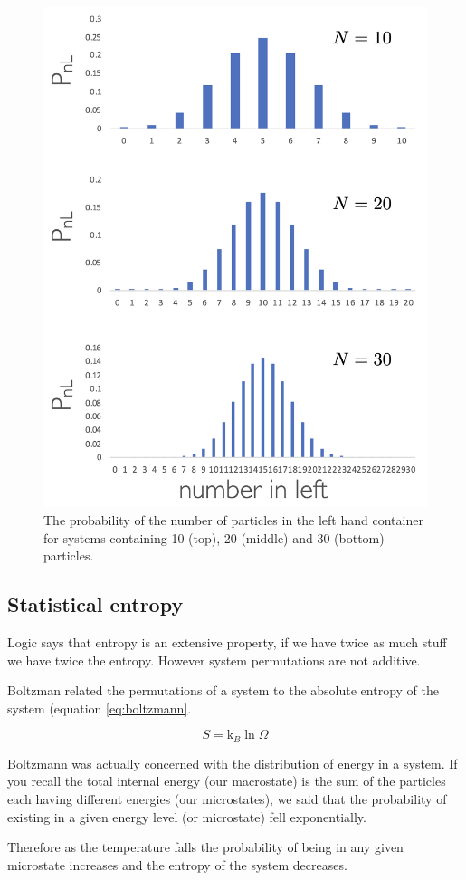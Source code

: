 \documentclass[
]{book}
\begin{document}
\begin{figure}

{\centering \includegraphics[width=0.5\linewidth]{images/probabilityleft} 

}

\caption{The probability of the number of particles in the left hand container for systems containing 10 (top), 20 (middle) and 30 (bottom) particles.}\label{fig:probabilityleft}
\end{figure}

\hypertarget{statistical-entropy}{%
\subsection{Statistical entropy}\label{statistical-entropy}}

Logic says that entropy is an extensive property, if we have twice as much stuff we have twice the entropy. However system permutations are not additive.

Boltzman related the permutations of a system to the absolute entropy of the system (equation \eqref{eq:boltzmann}.

\begin{equation}
S=\textrm{k}_B \ln \Omega
\label{eq:boltzmann}
\end{equation}

Boltzmann was actually concerned with the distribution of energy in a system. If you recall the total internal energy (our macrostate) is the sum of the particles each having different energies (our microstates), we said that the probability of existing in a given energy level (or microstate) fell exponentially.

Therefore as the temperature falls the probability of being in any given microstate increases and the entropy of the system decreases.
\end{document}
